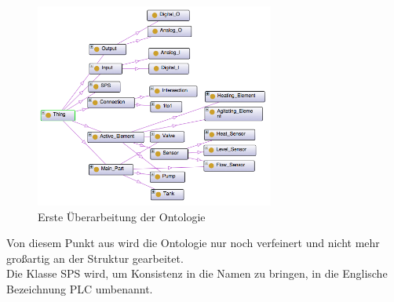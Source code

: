 \begin{figure}[hbt!]
  \centering
  \includegraphics[width=0.7\textwidth]{graphics/implementation/Ontology_v2}
  \caption{Erste Überarbeitung der Ontologie}
  \label{fig:v2_ontology}
\end{figure}

Von diesem Punkt aus wird die Ontologie nur noch verfeinert und nicht mehr großartig an der Struktur gearbeitet.\\
Die Klasse \ac{SPS} wird, um Konsistenz in die Namen zu bringen, in die Englische Bezeichnung \ac{PLC} umbenannt. 

